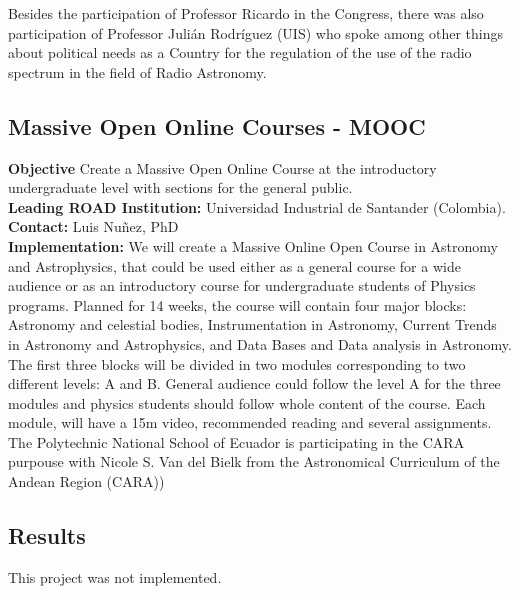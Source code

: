 Besides the participation of Professor Ricardo in the Congress, there was also participation of Professor Julián Rodríguez (UIS) who spoke among other things about political needs as a Country for the regulation of the use of the radio spectrum in the field of Radio Astronomy.








\subsection{Massive Open Online Courses - MOOC}
\textbf{Objective} Create a Massive Open Online Course at the introductory undergraduate level with sections for the general public.
\\
\textbf{Leading ROAD Institution:} Universidad Industrial de Santander (Colombia).
\\
\textbf{Contact: }Luis Nuñez, PhD 
\\
\textbf{Implementation:} We will create a Massive Online Open Course in Astronomy and Astrophysics, that could be used either as a general course for a wide audience or as an introductory course for undergraduate students of Physics programs. Planned for 14 weeks, the course will contain four major blocks: Astronomy and celestial bodies, Instrumentation in Astronomy, Current Trends in Astronomy and Astrophysics, and Data Bases and Data analysis in Astronomy. The first three blocks will be divided in two modules corresponding to two different levels: A and B. General audience could follow the level A for the three modules and physics students should follow whole content of the course.
Each module, will have a 15m video, recommended reading and several assignments.
\\
The Polytechnic National School of Ecuador is participating in the CARA purpouse with Nicole S. Van del Bielk from the Astronomical Curriculum of the Andean Region (CARA))


\subsection{Results}

This project was not implemented.


